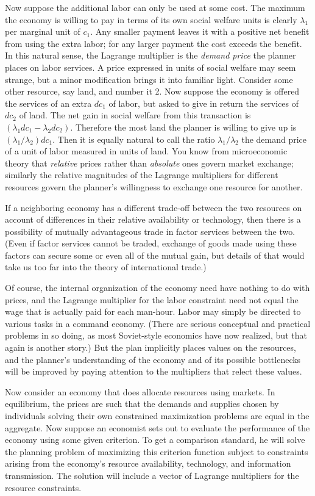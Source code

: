 Now suppose the additional labor can only be used at some cost. The maximum the economy is willing to pay in terms of its own social welfare units is clearly $\lambda_1$ per marginal unit of $c_1$. Any smaller payment leaves it with a positive net benefit from using the extra labor; for any larger payment the cost exceeds the benefit. In this natural sense, the Lagrange multiplier is the \textit{demand price}  the planner places on labor services. A price expressed in units of social welfare may seem strange, but a minor modification brings it into familiar light. Consider some other resource, say land, and number it 2. Now suppose the economy is offered the services of an extra $dc_1$ of labor, but asked to give in return the services of $dc_2$ of land. The net gain in social welfare from this transaction is $(\lambda_1 dc_1 - \lambda_2 dc_2)$. Therefore the most land the planner is willing to give up is $(\lambda_1/ \lambda_2 )dc_1$. Then it is equally natural to call the ratio $\lambda_1/ \lambda_2$ the demand price of a unit of labor measured in units of land. You know from microeconomic theory that \textit{relative} prices rather than \textit{absolute} ones govern market exchange; similarly the relative magnitudes of the Lagrange multipliers for different resources govern the planner's willingness to exchange one resource for another.

If a neighboring economy has a different trade-off between the two resources on account of differences in their relative availability or technology, then there is a possibility of mutually advantageous trade in factor services between the two. (Even if factor services cannot be traded, exchange of goods made using these factors can secure some or even all of the mutual gain, but details of that would take us too far into the theory of international trade.)

Of course, the internal organization of the economy need have nothing to do with prices, and the Lagrange multiplier for the labor constraint need not equal the wage that is actually paid for each man-hour. Labor may simply be directed to various tasks in a command economy. (There are serious conceptual and practical problems in so doing, as most Soviet-style economics have now realized, but that again is another story.) But the plan implicitly places values on the resources, and the planner's understanding of the economy and of its possible bottlenecks will be improved by paying attention to the multipliers that relect these values.

Now consider an economy that does allocate resources using markets. In equilibrium, the prices are such that the demands and supplies chosen by individuals solving their own constrained maximization problems are equal in the aggregate. Now suppose an economist sets out to evaluate the performance of the economy using some given criterion. To get a comparison standard, he will solve the planning problem of maximizing this criterion function subject to constraints arising from the economy's resource availability, technology, and information transmission. The solution will include a vector of Lagrange multipliers for the resource constraints.

